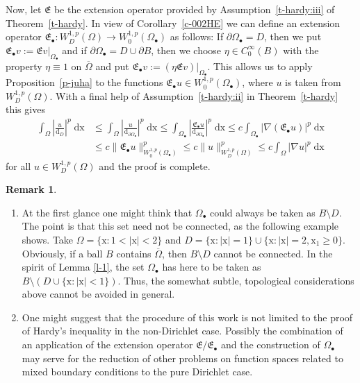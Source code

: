 \documentclass[10pt,leqno]{amsart}
\theoremstyle{definition}
\newtheorem{remark}[theorem]{Remark}
\numberwithin{equation}{section}
\begin{document}
Now, let $\mathfrak{E}$ be the extension operator provided by
Assumption~\ref{t-hardy:iii} of Theorem~\ref{t-hardy}. In view of
Corollary~\ref{c-002HE} we can define an extension operator $\mathfrak E_\bullet
: W^{1,p}_D(\Omega) \to W^{1,p}_0(\Omega_\bullet)$ as follows: If $\partial
\Omega_\bullet =D$, then we put $\mathfrak E_\bullet v := \mathfrak E
v|_{\Omega_\bullet}$ and if $\partial \Omega_\bullet = D \cup \partial B$, then
we choose $\eta \in C_0^\infty(B)$ with the property $\eta \equiv 1$ on
$\overline \Omega$ and put $\mathfrak E_\bullet v := ( \eta \mathfrak E v
)|_{\Omega_\bullet}$. This allows us to apply Proposition~\ref{p-juha} to the
functions $\mathfrak E_\bullet u \in W^{1,p}_0(\Omega_\bullet)$, where $u$ is
taken from $W^{1,p}_D(\Omega)$. With a final help of Assumption~\ref{t-hardy:ii}
in Theorem~\ref{t-hardy} this gives
\begin{align*}
  \int_\Omega \left| \frac{u}{{{\mathrm d}}_D} \right|^p \; {{\mathrm{d}}} \mathrm{x} &\le
	\int_\Omega \left| \frac{u}{{{\mathrm d}}_{\partial \Omega_\bullet}} \right|^p
	\; {{\mathrm{d}}} \mathrm{x} \le \int_{\Omega_\bullet} \left|
	\frac{\mathfrak E_\bullet u}{{{\mathrm d}}_{\partial \Omega_\bullet}} \right|^p
	\; {{\mathrm{d}}} \mathrm{x} \le  c \int_{\Omega_\bullet} |
	\nabla (\mathfrak E_\bullet u)|^p \; {{\mathrm{d}}} \mathrm{x} \nonumber \\
 &\le c \|\mathfrak E_\bullet u\|^p_{W^{1,p}_0(\Omega_\bullet)}
  \le c \|u\|^p_{W^{1,p}_D(\Omega)} \le c \int_{\Omega} |\nabla u|^p
	\; {{\mathrm{d}}} \mathrm{x}
\end{align*}
for all $u \in W^{1,p}_D(\Omega)$ and the proof is complete.

\begin{remark} \label{r-pointiii}
 \begin{enumerate} 
  \item At the first glance one might think that $\Omega_\bullet$ could always
	be taken as $B \setminus D$. The point is that this set need not be
	connected, as the following example shows. Take $\Omega = \{ {{\mathrm x}}
	: 1 < |{{\mathrm x}}| < 2 \}$ and $D = \{ {{\mathrm x}} : |{{\mathrm x}}| = 1 \}
	\cup \{ {{\mathrm x}} : |{{\mathrm x}}| = 2, {{\mathrm x}}_1 \ge 0 \}$. Obviously, if a
	ball $B$ contains $\overline \Omega$, then $B \setminus D$ cannot be
        connected. In the spirit of Lemma \ref{l-1}, the set $\Omega_\bullet$
        has here to be taken as $B \setminus (D \cup \{{{\mathrm x}} : |{{\mathrm x}}|
        < 1 \})$. Thus, the somewhat subtle, topological considerations above
	cannot be avoided in general.
  \item One might suggest that the procedure of this work is not limited to
	the proof of Hardy's inequality in the non-Dirichlet case. Possibly the
	 combination of an application of the extension operator $\mathfrak E
	/\mathfrak E_\bullet$ and the construction of $\Omega_\bullet$ may serve
	for the reduction of other problems on function spaces related to mixed
	boundary conditions to the pure Dirichlet case.
\end{enumerate}
\end{remark}
\end{document}
